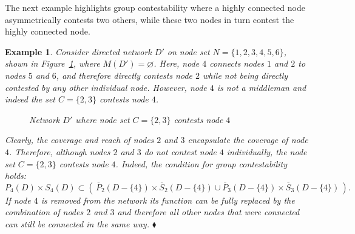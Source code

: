 \documentclass[11pt,fleqn]{article}
\newtheorem{expl}[theorem]{Example}
\newenvironment{example}{\begin{expl} \rm}{\hfill $\blacklozenge$ \end{expl}}{}
\begin{document}
The next example highlights group contestability where a highly connected node asymmetrically contests two others, while these two nodes in turn contest the highly connected node.

\begin{example} \label{Group Contestability}
Consider directed network $D'$ on node set $N = \{1,2,3,4,5,6\}$, shown in Figure~\ref{Complex Contestability}, where $M(D') = \varnothing$. Here, node $4$ connects nodes $1$ and $2$ to nodes $5$ and $6$, and therefore directly contests node $2$ while not being directly contested by any other individual node. However, node $4$ is not a middleman and indeed the set $ C= \{ 2,3 \}$ contests node $4$.

\begin{figure}[h]
\begin{center}
\caption[Network where node set $C = \{ 2,3 \}$ contests node $4$]{Network $D'$ where node set $C = \{ 2,3 \}$ contests node $4$}
\label{Complex Contestability}
\end{center}
\end{figure}

\noindent
Clearly, the coverage and reach of nodes $2$ and $3$ encapsulate the coverage of node $4$. Therefore, although nodes $2$ and $3$ do not contest node $4$ individually, the node set $C = \{ 2,3 \}$ contests node $4$. Indeed, the condition for group contestability holds:
\begin{equation}
P_{4}(D) \times S_{4}(D) \subset \left( \, \overline{P}_{2}(D - \{4\}) \times \overline{S}_{2}(D - \{4\}) \cup \overline{P}_{3}(D - \{4\}) \times \overline{S}_{3}(D - \{4\}) \, \right).
\end{equation}
If node $4$ is removed from the network its function can be fully replaced by the combination of nodes $2$ and $3$ and therefore all other nodes that were connected can still be connected in the same way.
\end{example}
\end{document}
